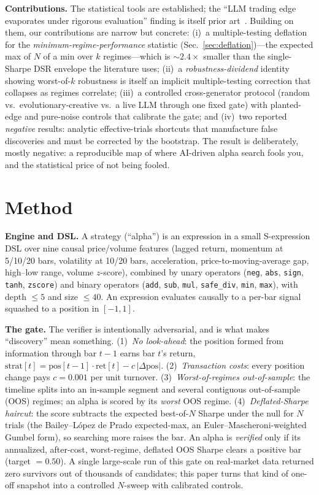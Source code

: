 \documentclass[sigconf]{acmart}
\begin{document}
\textbf{Contributions.} The statistical tools are established; the ``LLM trading edge evaporates under rigorous evaluation'' finding is itself prior art~\cite{finsaber2026}. Building on them, our contributions are narrow but concrete: (i)~a multiple-testing deflation for the \emph{minimum-regime-performance} statistic (Sec.~\ref{sec:deflation})---the expected max of $N$ of a min over $k$ regimes---which is ${\sim}2.4\times$ smaller than the single-Sharpe DSR envelope the literature uses; (ii)~a \emph{robustness-dividend} identity showing worst-of-$k$ robustness is itself an implicit multiple-testing correction that collapses as regimes correlate; (iii)~a controlled cross-generator protocol (random vs.\ evolutionary-creative vs.\ a live LLM through one fixed gate) with planted-edge and pure-noise controls that calibrate the gate; and (iv)~two reported \emph{negative} results: analytic effective-trials shortcuts that manufacture false discoveries and must be corrected by the bootstrap. The result is deliberately, mostly negative: a reproducible map of where AI-driven alpha search fools you, and the statistical price of not being fooled.

\section{Method}
\textbf{Engine and DSL.} A strategy (``alpha'') is an expression in a small S-expression DSL over nine causal price/volume features (lagged return, momentum at 5/10/20 bars, volatility at 10/20 bars, acceleration, price-to-moving-average gap, high--low range, volume $z$-score), combined by unary operators (\texttt{neg}, \texttt{abs}, \texttt{sign}, \texttt{tanh}, \texttt{zscore}) and binary operators (\texttt{add}, \texttt{sub}, \texttt{mul}, \texttt{safe\_div}, \texttt{min}, \texttt{max}), with depth $\le 5$ and size $\le 40$. An expression evaluates causally to a per-bar signal squashed to a position in $[-1,1]$.

\textbf{The gate.} The verifier is intentionally adversarial, and is what makes ``discovery'' mean something. (1)~\emph{No look-ahead}: the position formed from information through bar $t{-}1$ earns bar $t$'s return, $\text{strat}[t]=\text{pos}[t{-}1]\cdot\text{ret}[t]-c\,|\Delta\text{pos}|$. (2)~\emph{Transaction costs}: every position change pays $c=0.001$ per unit turnover. (3)~\emph{Worst-of-regimes out-of-sample}: the timeline splits into an in-sample segment and several contiguous out-of-sample (OOS) regimes; an alpha is scored by its \emph{worst} OOS regime. (4)~\emph{Deflated-Sharpe haircut}: the score subtracts the expected best-of-$N$ Sharpe under the null for $N$ trials (the Bailey--L\'opez de Prado expected-max, an Euler--Mascheroni-weighted Gumbel form), so searching more raises the bar. An alpha is \emph{verified} only if its annualized, after-cost, worst-regime, deflated OOS Sharpe clears a positive bar (target $=0.50$). A single large-scale run of this gate on real-market data returned zero survivors out of thousands of candidates; this paper turns that kind of one-off snapshot into a controlled $N$-sweep with calibrated controls.
\end{document}
